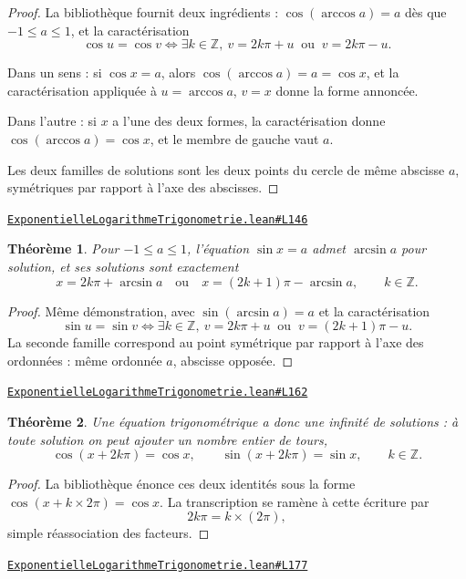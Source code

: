 \documentclass[11pt,a4paper]{article}
\theoremstyle{definition}
\theoremstyle{plain}
\newtheorem{theoreme}{Théorème}
\newcommand{\source}[2]{\par\smallskip\noindent\hfill{\footnotesize\href{#1}{\texttt{#2}}}\par\smallskip}
\begin{document}
\begin{proof}
La bibliothèque fournit deux ingrédients : $\cos(\arccos a) = a$ dès que
$-1 \le a \le 1$, et la caractérisation
\[ \cos u = \cos v \iff \exists k \in \mathbb{Z},\
   v = 2k\pi + u \ \text{ ou } \ v = 2k\pi - u . \]

Dans un sens : si $\cos x = a$, alors $\cos(\arccos a) = a = \cos x$, et la
caractérisation appliquée à $u = \arccos a$, $v = x$ donne la forme annoncée.

Dans l'autre : si $x$ a l'une des deux formes, la caractérisation donne
$\cos(\arccos a) = \cos x$, et le membre de gauche vaut $a$.

\medskip\noindent
Les deux familles de solutions sont les deux points du cercle de même abscisse $a$,
symétriques par rapport à l'axe des abscisses.
\end{proof}
\source{https://github.com/Commutator-IO/learn-lean/blob/main/courses/02-lycee/05-exponentielle-logarithme-trigonometrie/ExponentielleLogarithmeTrigonometrie.lean\#L146}{ExponentielleLogarithmeTrigonometrie.lean\#L146}

\begin{theoreme}
Pour $-1 \le a \le 1$, l'équation $\sin x = a$ admet $\arcsin a$ pour solution, et ses
solutions sont exactement
\[ x = 2k\pi + \arcsin a \quad \text{ou} \quad x = (2k+1)\pi - \arcsin a,
   \qquad k \in \mathbb{Z} . \]
\end{theoreme}

\begin{proof}
Même démonstration, avec $\sin(\arcsin a) = a$ et la caractérisation
\[ \sin u = \sin v \iff \exists k \in \mathbb{Z},\
   v = 2k\pi + u \ \text{ ou } \ v = (2k+1)\pi - u . \]
La seconde famille correspond au point symétrique par rapport à l'axe des ordonnées : même
ordonnée $a$, abscisse opposée.
\end{proof}
\source{https://github.com/Commutator-IO/learn-lean/blob/main/courses/02-lycee/05-exponentielle-logarithme-trigonometrie/ExponentielleLogarithmeTrigonometrie.lean\#L162}{ExponentielleLogarithmeTrigonometrie.lean\#L162}

\begin{theoreme}
Une équation trigonométrique a donc une infinité de solutions : à toute solution on peut
ajouter un nombre entier de tours,
\[ \cos(x + 2k\pi) = \cos x, \qquad \sin(x + 2k\pi) = \sin x, \qquad k \in \mathbb{Z} . \]
\end{theoreme}

\begin{proof}
La bibliothèque énonce ces deux identités sous la forme $\cos(x + k \times 2\pi) = \cos x$.
La transcription se ramène à cette écriture par
\[ 2k\pi = k \times (2\pi) , \]
simple réassociation des facteurs.
\end{proof}
\source{https://github.com/Commutator-IO/learn-lean/blob/main/courses/02-lycee/05-exponentielle-logarithme-trigonometrie/ExponentielleLogarithmeTrigonometrie.lean\#L177}{ExponentielleLogarithmeTrigonometrie.lean\#L177}
\end{document}
